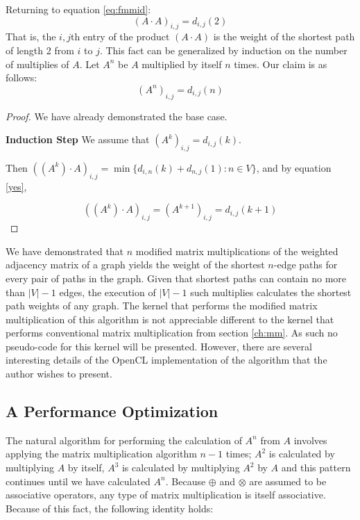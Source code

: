 \documentclass[12pt,twoside]{reedthesis}
\begin{document}
Returning to equation \ref{eq:fmmid}:
$$
(A \cdot A)_{i,j} = d_{i,j}(2)
$$
That is, the $i,j$th entry of the product $(A \cdot A)$ is the weight of the shortest path of length 2 from $i$ to $j$.
This fact can be generalized by induction on the number of multiplies of $A$. Let $A^n$ be $A$ multiplied by itself $n$ times. Our claim is as follows:
\begin{equation}
(A^n)_{i,j} = d_{i,j}(n)
\end{equation}
\begin{proof}
We have already demonstrated the base case.
\vspace{.5pc}

\textbf{Induction Step}
We assume that $(A^k)_{i,j} = d_{i,j}(k)$.

Then $((A^k)\cdot A)_{i,j} = \min \{d_{i,n}(k) + d_{n,j}(1) : n \in V \}$, and by equation \ref{yes},

$$
((A^k)\cdot A)_{i,j} = (A^{k+1})_{i,j} = d_{i,j}(k+1)
$$
\end{proof}

We have demonstrated  that $n$ modified matrix multiplications of the weighted adjacency \label{alg:pbf}matrix of a graph yields the weight of the shortest $n$-edge paths for every pair of paths in the graph. Given that shortest paths can contain no more than $|V|-1$ edges, the execution of $|V| - 1$ such multiplies calculates the shortest path weights of any graph. The kernel that performs the modified matrix multiplication of this algorithm is not appreciable different to the kernel that performs conventional matrix multiplication from section \ref{ch:mm}. As such no pseudo-code for this kernel will be presented. However, there are several interesting details of the OpenCL implementation of the algorithm that the author wishes to present.
\vspace{1pc}

\subsection{A Performance Optimization}
The natural algorithm for performing the calculation of $A^n$ from $A$ involves applying the matrix multiplication algorithm $n-1$ times; $A^2$ is calculated by multiplying $A$ by itself, $A^3$ is calculated by multiplying $A^2$ by $A$ and this pattern continues until we have calculated $A^{n}$. Because $\oplus$ and $\otimes$ are assumed to be associative operators, any type of matrix multiplication is itself associative. Because of this fact, the following identity holds:
\end{document}
